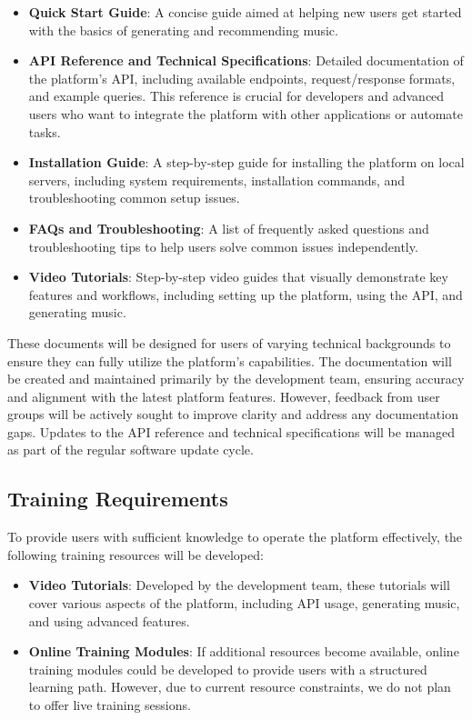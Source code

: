 \documentclass[12pt]{article}
\begin{document}
\begin{itemize}
  \item \textbf{Quick Start Guide}: A concise guide aimed at helping new users get started with the basics of generating and recommending music.
  \item \textbf{API Reference and Technical Specifications}: Detailed documentation of the platform’s API, including available endpoints, request/response formats, and example queries. This reference is crucial for developers and advanced users who want to integrate the platform with other applications or automate tasks.
  \item \textbf{Installation Guide}: A step-by-step guide for installing the platform on local servers, including system requirements, installation commands, and troubleshooting common setup issues.
  \item \textbf{FAQs and Troubleshooting}: A list of frequently asked questions and troubleshooting tips to help users solve common issues independently.
  \item \textbf{Video Tutorials}: Step-by-step video guides that visually demonstrate key features and workflows, including setting up the platform, using the API, and generating music.
\end{itemize}

These documents will be designed for users of varying technical backgrounds to ensure they can fully utilize the platform's capabilities. The documentation will be created and maintained primarily by the development team, ensuring accuracy and alignment with the latest platform features. However, feedback from user groups will be actively sought to improve clarity and address any documentation gaps. Updates to the API reference and technical specifications will be managed as part of the regular software update cycle.
\subsection{Training Requirements}

To provide users with sufficient knowledge to operate the platform effectively, the following training resources will be developed:

\begin{itemize}
  \item \textbf{Video Tutorials}: Developed by the development team, these tutorials will cover various aspects of the platform, including API usage, generating music, and using advanced features. 
  \item \textbf{Online Training Modules}: If additional resources become available, online training modules could be developed to provide users with a structured learning path. However, due to current resource constraints, we do not plan to offer live training sessions.
\end{itemize}
\end{document}

